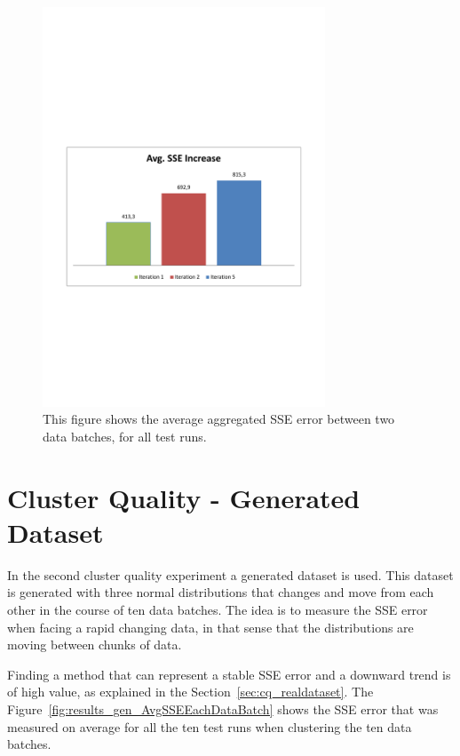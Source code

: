 \begin{figure}[ht]
\centering
\includegraphics[trim = 10mm 90mm 10mm 100mm, clip, width=0.75\textwidth]{Figures/experiments/zdataWO_AvgSSEIncrease.pdf}
\caption{This figure shows the average aggregated SSE error between two data batches, for all test runs.}
\label{fig:AvgSSEIncrease}
\end{figure}

\newpage

\section{Cluster Quality - Generated Dataset}
In the second cluster quality experiment a generated dataset is used. This dataset is generated with three normal distributions that changes and move from each other in the course of ten data batches. The idea is to measure the SSE error when facing a rapid changing data, in that sense that the distributions are moving between chunks of data. 

Finding a method that can represent a stable SSE error and a downward trend is of high value, as explained in the Section~\ref{sec:cq_realdataset}. The Figure~\ref{fig:results_gen_AvgSSEEachDataBatch} shows the SSE error that was measured on average for all the ten test runs when clustering the ten data batches.

